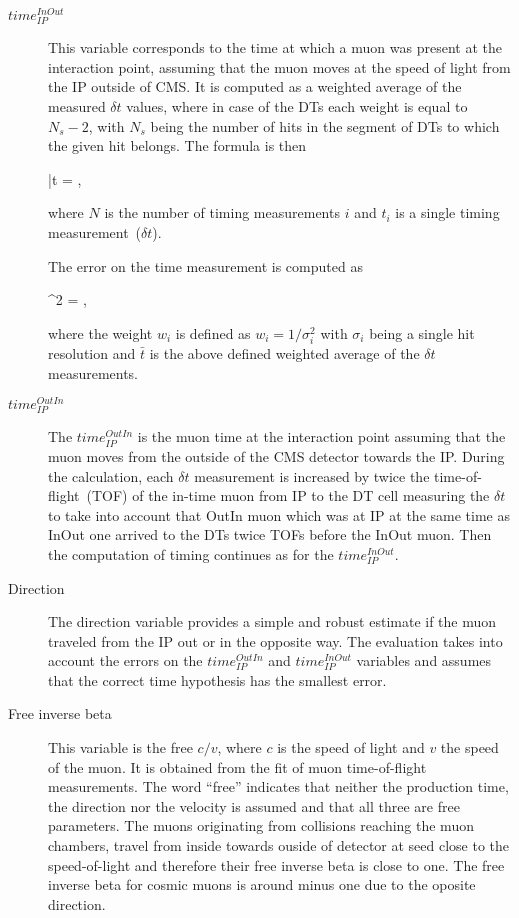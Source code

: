 \begin{description}
\item [$time_{IP}^{InOut}$]
This variable corresponds to the time at which a muon was present at the interaction point, assuming that the muon moves at the speed of light from the IP outside of CMS. It is computed as a weighted average of the measured $\delta t$ values, where in case of the DTs each weight is equal to $N_{s}-2$, with $N_{s}$ being the number of hits in the segment of DTs to which the given hit belongs. The formula is then

{
 \bar{t} =  \times {} \times {},
}

where $N$ is the number of timing measurements $i$ and $t_{i}$ is a single timing measurement~($\delta t$).

The error on the time measurement is computed as

{
 \sigma^{2} =  \times {} \times {},
}

where the weight $w_{i}$ is defined as $w_i = 1/\sigma_{i}^2$ with $\sigma_{i}$ being a single hit resolution and $\bar{t}$ is the above defined weighted average of the $\delta t$ measurements.

\item[$time_{IP}^{OutIn}$ ]
The $time_{IP}^{OutIn}$ is the muon time at the interaction point assuming that the muon moves from the outside of the CMS detector towards the IP. During the calculation, each $\delta t$ measurement is increased by twice the time-of-flight~(TOF) of the in-time muon from IP to the DT cell measuring the $\delta t$ to take into account that OutIn muon which was at IP at the same time as InOut one arrived to the DTs twice TOFs before the InOut muon. Then the computation of timing continues as for the $time_{IP}^{InOut}$.

\item[Direction]
The direction variable provides a simple and robust estimate if the muon traveled from the IP out or in the opposite way. The evaluation takes into account the errors on the $time_{IP}^{OutIn}$ and $time_{IP}^{InOut}$ variables and assumes that the correct time hypothesis has the smallest error.

\item[Free inverse beta]
This variable is the free $c/v$, where $c$ is the speed of light and $v$ the speed of the muon.  It is obtained from the fit of muon time-of-flight measurements. The word ``free'' indicates that neither the production time, the direction nor the velocity is assumed and that all three are free parameters. The muons originating from collisions reaching the muon chambers, travel from inside towards ouside of detector at seed close to the speed-of-light and therefore their free inverse beta is close to one. The free inverse beta for cosmic muons is around minus one due to the oposite direction.


\end{description}
